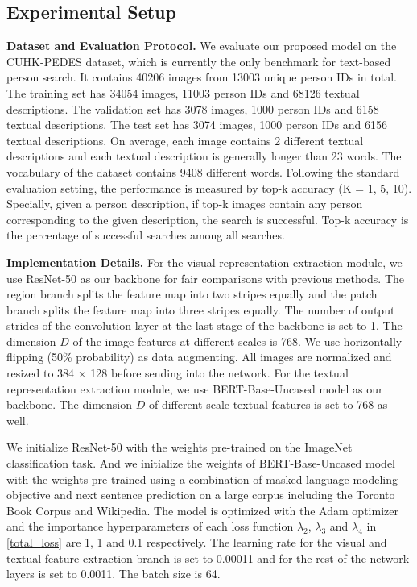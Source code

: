 \documentclass[final]{cvpr}
\begin{document}
\subsection{Experimental Setup}
\textbf{Dataset and Evaluation Protocol.} We evaluate our proposed model on the CUHK-PEDES dataset, which is currently the only benchmark for text-based person search.
It contains 40206 images from 13003 unique person IDs in total. 
The training set has 34054 images, 11003 person IDs and 68126 textual descriptions. 
The validation set has 3078 images, 1000 person IDs and 6158 textual descriptions. 
The test set has 3074 images, 1000 person IDs and 6156 textual descriptions. 
On average, each image contains 2 different textual descriptions and each textual description is generally longer than 23 words. 
The vocabulary of the dataset contains 9408 different words.
Following the standard evaluation setting, the performance is measured by top-k accuracy (K = 1, 5, 10). Specially, given a person description, if top-k images contain any person corresponding to the given description, the search is successful. Top-k accuracy is the percentage of successful searches among all searches.


\textbf{Implementation Details.} For the visual representation extraction module, we use ResNet-50 as our backbone for fair comparisons with previous methods. The region branch splits the feature map into two stripes equally and the patch branch splits the feature map into three stripes equally.  
The number of output strides of the convolution layer at the last stage of the backbone is set to 1.
The dimension $D$ of the image features at different scales is 768.  
We use horizontally flipping (50\% probability) as data augmenting. 
All images are normalized and resized to 384 $\times$ 128 before sending into the network. 
For the textual representation extraction module, we use BERT-Base-Uncased model as our backbone. 
The dimension $D$ of different scale textual features is set to 768 as well. 

We initialize ResNet-50 with the weights pre-trained on the ImageNet classification task. And we initialize the weights of BERT-Base-Uncased model with the weights pre-trained using a combination of masked language modeling objective and next sentence prediction on a large corpus including the Toronto Book Corpus and Wikipedia. 
The model is optimized with the Adam \cite{kingma2014adam} optimizer and the importance hyperparameters of each loss function $\lambda_{2}$, $\lambda_{3}$ and $\lambda_{4}$ in \ref{total_loss} are 1, 1 and 0.1 respectively.
The learning rate for the visual and textual feature extraction branch is set to 0.00011 and for the rest of the network layers is set to 0.0011. The batch size is 64.
\end{document}
